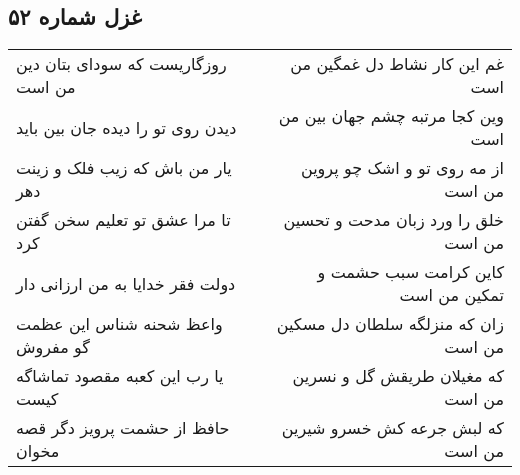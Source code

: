\begin{center}
\section*{غزل شماره ۵۲}
\label{sec:sh052}
\begin{longtable}{l p{0.5cm} r}
روزگاریست که سودای بتان دین من است
&&
غم این کار نشاط دل غمگین من است
\\
دیدن روی تو را دیده جان بین باید
&&
وین کجا مرتبه چشم جهان بین من است
\\
یار من باش که زیب فلک و زینت دهر
&&
از مه روی تو و اشک چو پروین من است
\\
تا مرا عشق تو تعلیم سخن گفتن کرد
&&
خلق را ورد زبان مدحت و تحسین من است
\\
دولت فقر خدایا به من ارزانی دار
&&
کاین کرامت سبب حشمت و تمکین من است
\\
واعظ شحنه شناس این عظمت گو مفروش
&&
زان که منزلگه سلطان دل مسکین من است
\\
یا رب این کعبه مقصود تماشاگه کیست
&&
که مغیلان طریقش گل و نسرین من است
\\
حافظ از حشمت پرویز دگر قصه مخوان
&&
که لبش جرعه کش خسرو شیرین من است
\\
\end{longtable}
\end{center}
